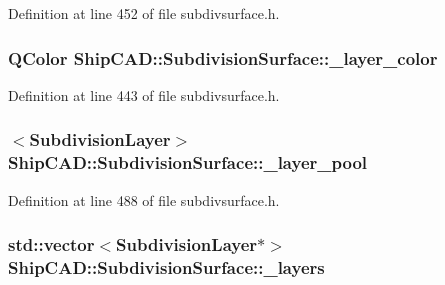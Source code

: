 Definition at line 452 of file subdivsurface.\+h.

\subsubsection[{\texorpdfstring{\+\_\+layer\+\_\+color}{_layer_color}}]{\setlength{\rightskip}{0pt plus 5cm}Q\+Color Ship\+C\+A\+D\+::\+Subdivision\+Surface\+::\+\_\+layer\+\_\+color\hspace{0.3cm}{\ttfamily [protected]}}\hypertarget{classShipCAD_1_1SubdivisionSurface_a0833012e177dfd6cdb71174cb7baed17}{}\label{classShipCAD_1_1SubdivisionSurface_a0833012e177dfd6cdb71174cb7baed17}


Definition at line 443 of file subdivsurface.\+h.

\subsubsection[{\texorpdfstring{\+\_\+layer\+\_\+pool}{_layer_pool}}]{$<${\bf Subdivision\+Layer}$>$ Ship\+C\+A\+D\+::\+Subdivision\+Surface\+::\+\_\+layer\+\_\+pool\hspace{0.3cm}{\ttfamily [protected]}}\hypertarget{classShipCAD_1_1SubdivisionSurface_ad32ad62ece5a7a0b0268913e2b314969}{}\label{classShipCAD_1_1SubdivisionSurface_ad32ad62ece5a7a0b0268913e2b314969}


Definition at line 488 of file subdivsurface.\+h.

\subsubsection[{\texorpdfstring{\+\_\+layers}{_layers}}]{\setlength{\rightskip}{0pt plus 5cm}std\+::vector$<${\bf Subdivision\+Layer}$\ast$$>$ Ship\+C\+A\+D\+::\+Subdivision\+Surface\+::\+\_\+layers\hspace{0.3cm}{\ttfamily [protected]}}\hypertarget{classShipCAD_1_1SubdivisionSurface_a87c6c8b63f203d788b8f4b361c814c96}{}\label{classShipCAD_1_1SubdivisionSurface_a87c6c8b63f203d788b8f4b361c814c96}


